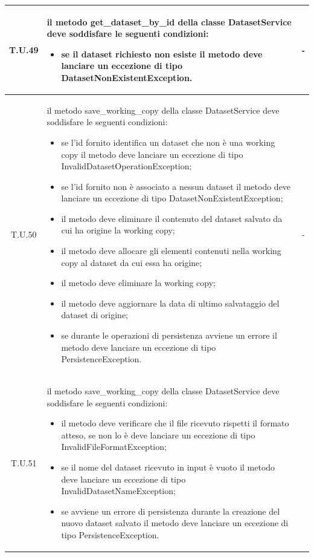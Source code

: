 \begin{tabularx}{\textwidth}{|c|X|c|}
    \hline 
    \label{tu:tu49} T.U.49 & il metodo get\_dataset\_by\_id della classe DatasetService deve soddisfare le seguenti condizioni:
    \begin{itemize}
        \item se il dataset richiesto non esiste il metodo deve lanciare un eccezione di tipo DatasetNonExistentException.
    \end{itemize} & - \\
    \hline 
    \label{tu:tu50} T.U.50 & il metodo save\_working\_copy della classe DatasetService deve soddisfare le seguenti condizioni:
    \begin{itemize}
        \item se l'id fornito identifica un dataset che non è una working copy il metodo deve lanciare un eccezione di tipo InvalidDatasetOperationException;
        \item se l'id fornito non è associato a nessun dataset il metodo deve lanciare un eccezione di tipo DatasetNonExistentException;
        \item il metodo deve eliminare il contenuto del dataset salvato da cui ha origine la working copy;
        \item il metodo deve allocare gli elementi contenuti nella working copy al dataset da cui essa ha origine;
        \item il metodo deve eliminare la working copy;
        \item il metodo deve aggiornare la data di ultimo salvataggio del dataset di origine;
        \item se durante le operazioni di persistenza avviene un errore il metodo deve lanciare un eccezione di tipo PersistenceException.  
    \end{itemize} & - \\
    \hline 
    \label{tu:tu51} T.U.51 & il metodo save\_working\_copy della classe DatasetService deve soddisfare le seguenti condizioni:
    \begin{itemize}
        \item il metodo deve verificare che il file ricevuto rispetti il formato atteso, se non lo è deve lanciare un eccezione di tipo InvalidFileFormatException;
        \item se il nome del dataset ricevuto in input è vuoto il metodo deve lanciare un eccezione di tipo InvalidDatasetNameException;
        \item se avviene un errore di persistenza durante la creazione del nuovo dataset salvato il metodo deve lanciare un eccezione di tipo PersistenceException.

\end{itemize}
\end{tabularx}
